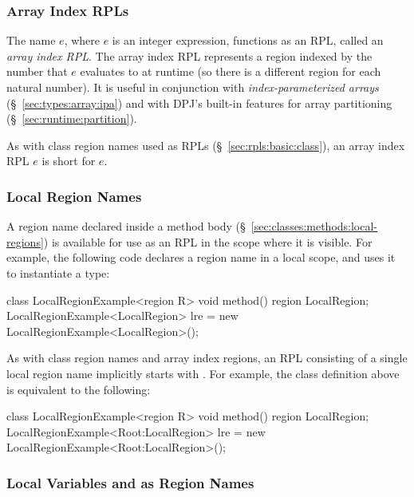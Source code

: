 \subsubsection{Array Index RPLs%
\label{sec:rpls:basic:array}}

The name \kwd{[}$e$\kwd{]}, where $e$ is an integer expression,
functions as an RPL, called an \emph{array index RPL}.  The array
index RPL represents a region indexed by the number that $e$
evaluates to at runtime (so there is a different region for each
natural number).  It is useful in conjunction with
\emph{index-parameterized arrays} (\S~\ref{sec:types:array:ipa}) and
with DPJ's built-in features for array partitioning
(\S~\ref{sec:runtime:partition}).

As with class region names used as RPLs
(\S~\ref{sec:rpls:basic:class}), an array index RPL \kwd{[}$e$\kwd{]}
is short for \kwd{Root:[}$e$\kwd{]}.

\subsubsection{Local Region Names%
\label{sec:rpls:basic:local}}


A region name declared inside a method body
(\S~\ref{sec:classes:methods:local-regions}) is available for use as
an RPL in the scope where it is visible.  For example, the following
code declares a region name  in a local scope, and
uses it to instantiate a type:
%
\begin{dpjlisting}
class LocalRegionExample<region R> {
    void method() {
        region LocalRegion;
        LocalRegionExample<LocalRegion> lre = 
          new LocalRegionExample<LocalRegion>();
    }
}
\end{dpjlisting}
%

As with class region names and array index regions, an RPL consisting
of a single local region name implicitly starts with .  For
example, the class definition above is equivalent to the following:
%
\begin{dpjlisting}
class LocalRegionExample<region R> {
    void method() {
        region LocalRegion;
        LocalRegionExample<Root:LocalRegion> lre = 
          new LocalRegionExample<Root:LocalRegion>();
    }
}
\end{dpjlisting}
%


\subsubsection{ Local Variables and  as Region Names%
\label{sec:rpls:basic:var}}

